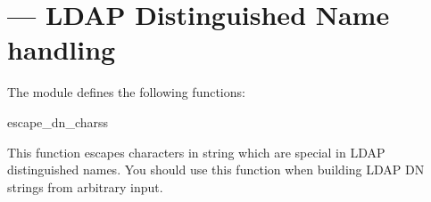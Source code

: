 
\section{ ---
  LDAP Distinguished Name handling }




The  module defines the following functions:

\begin{funcdesc}{escape_dn_chars}{s} %

This function escapes characters in string  which
are special in LDAP distinguished names. You should use this function when
building LDAP DN strings from arbitrary input.

\begin{seealso}
\end{seealso}

\end{funcdesc}

